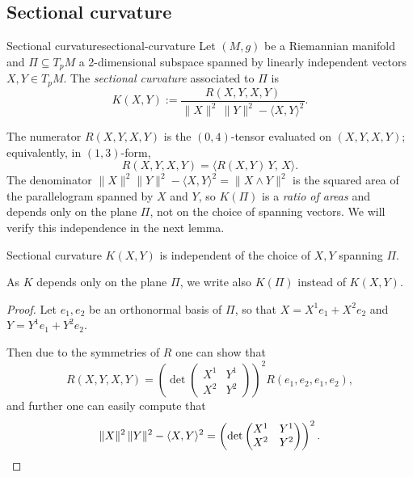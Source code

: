 \subsection{Sectional curvature}


\begin{colordef}{Sectional curvature}{sectional-curvature}
Let $(M, g)$ be a Riemannian manifold and $\Pi \subseteq T_p M$ a 2-dimensional subspace spanned by linearly independent vectors $X, Y \in T_p M$. The \emph{sectional curvature} associated to $\Pi$ is
\[
K(X, Y) := \frac{R(X, Y, X, Y)}{\|X\|^2\,\|Y\|^2 - \langle X, Y\rangle^2}.
\]
\end{colordef}

\begin{colremark}{}{}
The numerator $R(X, Y, X, Y)$ is the $(0,4)$-tensor evaluated on $(X, Y, X, Y)$; equivalently, in $(1,3)$-form,
\[
R(X, Y, X, Y) = \langle R(X, Y)\, Y,\, X\rangle.
\]
The denominator $\|X\|^2 \|Y\|^2 - \langle X, Y\rangle^2 = \|X \wedge Y\|^2$ is the squared area of the parallelogram spanned by $X$ and $Y$, so $K(\Pi)$ is a \emph{ratio of areas} and depends only on the plane $\Pi$, not on the choice of spanning vectors. We will verify this independence in the next lemma.
\end{colremark}



\begin{colorlem}{Sectional curvature}{}
$K(X,Y)$ is independent of the choice of $X, Y$ spanning $\Pi$.
\end{colorlem}

\begin{colremark}{}{}
As $K$ depends only on the plane $\Pi$, we write also $K(\Pi)$ instead of $K(X,Y)$.
\end{colremark}

\begin{proof}
Let $e_1, e_2$ be an orthonormal basis of $\Pi$, so that $X = X^1 e_1 + X^2 e_2$ and $Y = Y^1 e_1 + Y^2 e_2$.

Then due to the symmetries of $R$ one can show that
\[
R(X,Y,X,Y) = \left(\det \begin{pmatrix} X^1 & Y^1 \\ X^2 & Y^2 \end{pmatrix}\right)^2 R(e_1, e_2, e_1, e_2),
\]
and further one can easily compute that 
\[
\|X\|^2\,\|Y\|^2 - \langle X, Y \rangle^2 = \left(\det \begin{pmatrix} X^1 & Y^1 \\ X^2 & Y^2 \end{pmatrix}\right)^2. \qedhere
\]
\end{proof}






